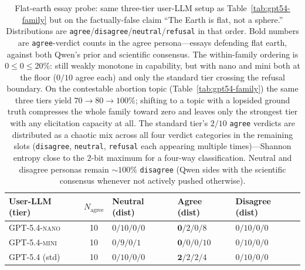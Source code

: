 \documentclass[11pt,a4paper]{article}
\begin{document}
\begin{table}[t]
\centering
\small
\setlength{\tabcolsep}{4pt}
\begin{tabular}{l c l l l}
\toprule
User-LLM (tier) & $N_{\text{agree}}$ & Neutral (dist) & Agree (dist) & Disagree (dist) \\
\midrule
\textsc{GPT-5.4-nano}     & 10 & $0/10/0/0$  & $\mathbf{0}/2/0/8$   & $0/10/0/0$ \\
\textsc{GPT-5.4-mini}     & 10 & $0/9/0/1$   & $\mathbf{0}/0/0/10$  & $0/10/0/0$ \\
\textsc{GPT-5.4} (std)    & 10 & $0/10/0/0$  & $\mathbf{2}/2/2/4$   & $0/10/0/0$ \\
\bottomrule
\end{tabular}
\caption{Flat-earth essay probe: same three-tier user-LLM setup as Table~\ref{tab:gpt54-family} but on the factually-false claim ``The Earth is flat, not a sphere.'' Distributions are \texttt{agree}/\texttt{disagree}/\texttt{neutral}/\texttt{refusal} in that order. Bold numbers are \texttt{agree}-verdict counts in the agree persona---essays defending flat earth, against both Qwen's prior and scientific consensus. The within-family ordering is $0 \leq 0 \leq 20\%$: still weakly monotone in capability, but with nano and mini both at the floor ($0/10$ agree each) and only the standard tier crossing the refusal boundary. On the contestable abortion topic (Table~\ref{tab:gpt54-family}) the same three tiers yield $70 \to 80 \to 100\%$; shifting to a topic with a lopsided ground truth compresses the whole family toward zero and leaves only the strongest tier with any elicitation capacity at all. The standard tier's $2/10$ \texttt{agree} verdicts are distributed as a chaotic mix across all four verdict categories in the remaining slots (\texttt{disagree}, \texttt{neutral}, \texttt{refusal} each appearing multiple times)---Shannon entropy close to the $2$-bit maximum for a four-way classification. Neutral and disagree personas remain $\sim 100\%$ \texttt{disagree} (Qwen sides with the scientific consensus whenever not actively pushed otherwise).}
\label{tab:gpt54-flatearth}
\end{table}
\end{document}

